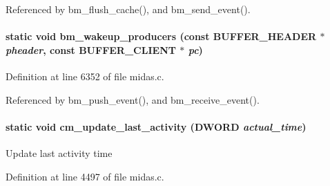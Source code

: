 Referenced by bm\_\-flush\_\-cache(), and bm\_\-send\_\-event().
\paragraph[{bm\_\-wakeup\_\-producers}]{\setlength{\rightskip}{0pt plus 5cm}static void bm\_\-wakeup\_\-producers (const {\bf BUFFER\_\-HEADER} $\ast$ {\em pheader}, \/  const {\bf BUFFER\_\-CLIENT} $\ast$ {\em pc})}\hfill\label{group__bmfunctionc_ga25b52998c14867875432bc2103231c78}


Definition at line 6352 of file midas.c.

Referenced by bm\_\-push\_\-event(), and bm\_\-receive\_\-event().
\paragraph[{cm\_\-update\_\-last\_\-activity}]{\setlength{\rightskip}{0pt plus 5cm}static void cm\_\-update\_\-last\_\-activity ({\bf DWORD} {\em actual\_\-time})}\hfill\label{group__bmfunctionc_ga2109ffa213706ade60f0b054d6c39164}
Update last activity time 

Definition at line 4497 of file midas.c.